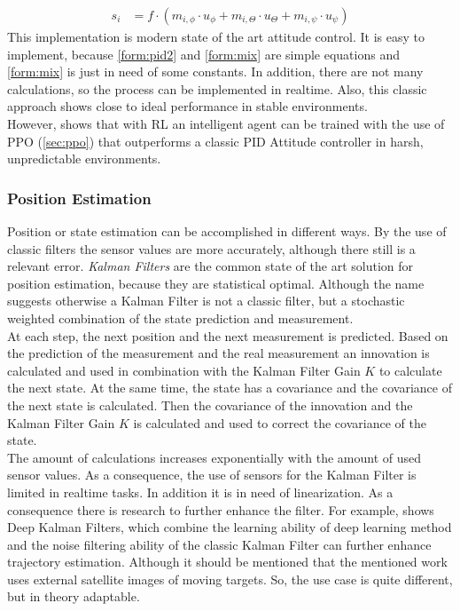 \begin{align}
	s_i &= f \cdot (m_{i,\phi} \cdot u_{\phi} + m_{i, \Theta} \cdot u_{\Theta} + m_{i,\psi} \cdot u_{\psi}) \label{form:mix}
\end{align}
\newline
This implementation is modern state of the art attitude control. It is easy to implement, because \cref{form:pid2} and \cref{form:mix} are simple equations and \cref{form:mix} is just in need of some constants. In addition, there are not many calculations, so the process can be implemented in realtime. Also, this classic approach shows close to ideal performance in stable environments.\\
However, \cite{koch2019reinforcement} shows that with RL an intelligent agent can be trained with the use of PPO (\cref{sec:ppo}) that outperforms a classic PID Attitude controller in harsh, unpredictable environments. 

\newpage

\subsubsection{Position Estimation}
Position or state estimation can be accomplished in different ways. By the use of classic filters the sensor values are more accurately, although there still is a relevant error. \emph{Kalman Filters} are the common state of the art solution for position estimation, because they are statistical optimal. Although the name suggests otherwise a Kalman Filter is not a classic filter, but a stochastic weighted combination of the state prediction and measurement. \\
At each step, the next position and the next measurement is predicted. Based on the prediction of the measurement and the real measurement an innovation is calculated and used in combination with the Kalman Filter Gain $K$ to calculate the next state. At the same time, the state has a covariance and the covariance of the next state is calculated. Then the covariance of the innovation and the Kalman Filter Gain $K$ is calculated and used to correct the covariance of the state.\\
The amount of calculations increases exponentially with the amount of used sensor values. As a consequence,
the use of sensors for the Kalman Filter is limited in realtime tasks. In addition it is in need of linearization. As a consequence there is research to further enhance the filter.
For example, \cite{shi2022deep} shows Deep Kalman Filters, which combine the learning ability of deep learning method and the noise filtering ability of the classic Kalman Filter can further enhance trajectory estimation. Although it should be mentioned that the mentioned work uses external satellite images of moving targets. So, the use case is quite different, but in theory adaptable. 

